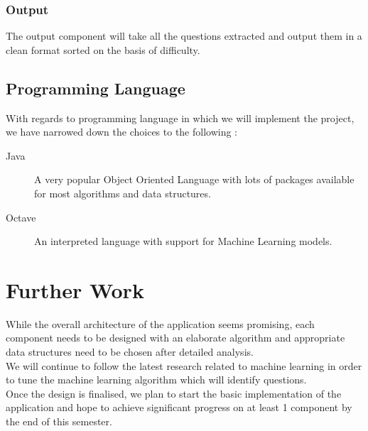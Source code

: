 \subsection{Output}

The output component will take all the questions extracted and output them in a clean format sorted on the basis of difficulty.

\section{Programming Language}

With regards to programming language in which we will implement the project, we have narrowed down the choices to the following : 
\begin{description}
	\item[Java] A very popular Object Oriented Language with lots of packages available for most algorithms and data structures.
	\item[Octave] An interpreted language with support for Machine Learning models.
\end{description}

\chapter{Further Work}

While the overall architecture of the application seems promising, each component needs to be designed with an elaborate algorithm and appropriate data structures need to be chosen after detailed analysis. \\

We will continue to follow the latest research related to machine learning in order to tune the machine learning algorithm which will identify questions. \\

Once the design is finalised, we plan to start the basic implementation of the application and hope to achieve significant progress on at least 1 component by the end of this semester.

